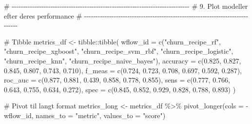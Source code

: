 \documentclass[
  11pt,
  letterpaper,
  DIV=11,
  numbers=noendperiod]{scrartcl}
\newenvironment{Shaded}{\begin{snugshade}}{\end{snugshade}}
\newcommand{\AttributeTok}[1]{\textcolor[rgb]{0.40,0.45,0.13}{#1}}
\newcommand{\CommentTok}[1]{\textcolor[rgb]{0.37,0.37,0.37}{#1}}
\newcommand{\FloatTok}[1]{\textcolor[rgb]{0.68,0.00,0.00}{#1}}
\newcommand{\FunctionTok}[1]{\textcolor[rgb]{0.28,0.35,0.67}{#1}}
\newcommand{\NormalTok}[1]{\textcolor[rgb]{0.00,0.23,0.31}{#1}}
\newcommand{\OtherTok}[1]{\textcolor[rgb]{0.00,0.23,0.31}{#1}}
\newcommand{\SpecialCharTok}[1]{\textcolor[rgb]{0.37,0.37,0.37}{#1}}
\newcommand{\StringTok}[1]{\textcolor[rgb]{0.13,0.47,0.30}{#1}}
\begin{document}
\begin{Shaded}
\begin{Highlighting}[]
\CommentTok{\# {-}{-}{-}{-}{-}{-}{-}{-}{-}{-}{-}{-}{-}{-}{-}{-}{-}{-}{-}{-}{-}{-}{-}{-}{-}{-}{-}{-}{-}{-}{-}{-}{-}{-}{-}{-}{-}{-}{-}{-}{-}{-}{-}{-}{-}{-}{-}{-}{-}{-}{-}{-}{-}{-}{-}{-}{-}{-}{-}{-}{-}{-}{-}{-}{-}{-}{-}{-}{-}{-}{-}{-}{-}{-}{-}{-}{-}{-}}
\CommentTok{\# 9. Plot modeller efter deres performance}
\CommentTok{\# {-}{-}{-}{-}{-}{-}{-}{-}{-}{-}{-}{-}{-}{-}{-}{-}{-}{-}{-}{-}{-}{-}{-}{-}{-}{-}{-}{-}{-}{-}{-}{-}{-}{-}{-}{-}{-}{-}{-}{-}{-}{-}{-}{-}{-}{-}{-}{-}{-}{-}{-}{-}{-}{-}{-}{-}{-}{-}{-}{-}{-}{-}{-}{-}{-}{-}{-}{-}{-}{-}{-}{-}{-}{-}{-}{-}{-}{-}}

\CommentTok{\# Tibble}
\NormalTok{metrics\_df }\OtherTok{\textless{}{-}}\NormalTok{ tibble}\SpecialCharTok{::}\FunctionTok{tibble}\NormalTok{(}
  \AttributeTok{wflow\_id =} \FunctionTok{c}\NormalTok{(}\StringTok{"churn\_recipe\_rf"}\NormalTok{, }\StringTok{"churn\_recipe\_xgboost"}\NormalTok{, }\StringTok{"churn\_recipe\_svm\_rbf"}\NormalTok{,}
               \StringTok{"churn\_recipe\_logistic"}\NormalTok{, }\StringTok{"churn\_recipe\_knn"}\NormalTok{, }\StringTok{"churn\_recipe\_naive\_bayes"}\NormalTok{),}
  \AttributeTok{accuracy =} \FunctionTok{c}\NormalTok{(}\FloatTok{0.825}\NormalTok{, }\FloatTok{0.827}\NormalTok{, }\FloatTok{0.845}\NormalTok{, }\FloatTok{0.807}\NormalTok{, }\FloatTok{0.743}\NormalTok{, }\FloatTok{0.710}\NormalTok{),}
  \AttributeTok{f\_meas   =} \FunctionTok{c}\NormalTok{(}\FloatTok{0.724}\NormalTok{, }\FloatTok{0.723}\NormalTok{, }\FloatTok{0.708}\NormalTok{, }\FloatTok{0.697}\NormalTok{, }\FloatTok{0.592}\NormalTok{, }\FloatTok{0.287}\NormalTok{),}
  \AttributeTok{roc\_auc  =} \FunctionTok{c}\NormalTok{(}\FloatTok{0.877}\NormalTok{, }\FloatTok{0.881}\NormalTok{, }\FloatTok{0.439}\NormalTok{, }\FloatTok{0.858}\NormalTok{, }\FloatTok{0.778}\NormalTok{, }\FloatTok{0.855}\NormalTok{),}
  \AttributeTok{sens     =} \FunctionTok{c}\NormalTok{(}\FloatTok{0.777}\NormalTok{, }\FloatTok{0.766}\NormalTok{, }\FloatTok{0.643}\NormalTok{, }\FloatTok{0.755}\NormalTok{, }\FloatTok{0.634}\NormalTok{, }\FloatTok{0.272}\NormalTok{),}
  \AttributeTok{spec     =} \FunctionTok{c}\NormalTok{(}\FloatTok{0.845}\NormalTok{, }\FloatTok{0.852}\NormalTok{, }\FloatTok{0.929}\NormalTok{, }\FloatTok{0.828}\NormalTok{, }\FloatTok{0.788}\NormalTok{, }\FloatTok{0.893}\NormalTok{)}
\NormalTok{)}

\CommentTok{\# Pivot til langt format}
\NormalTok{metrics\_long }\OtherTok{\textless{}{-}}\NormalTok{ metrics\_df }\SpecialCharTok{\%\textgreater{}\%}
  \FunctionTok{pivot\_longer}\NormalTok{(}\AttributeTok{cols =} \SpecialCharTok{{-}}\NormalTok{wflow\_id, }\AttributeTok{names\_to =} \StringTok{"metric"}\NormalTok{, }\AttributeTok{values\_to =} \StringTok{"score"}\NormalTok{)}


\end{Highlighting}
\end{Shaded}
\end{document}
